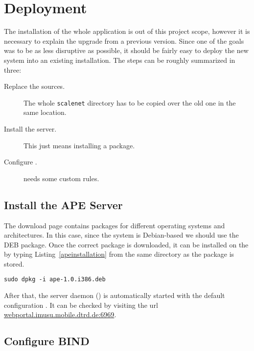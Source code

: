 \section{Deployment} %
\label{sec:deployment}

The installation of the whole  application is out of this project scope, however it is necessary to explain the upgrade from a previous version.
Since one of the goals was to be as less disruptive as possible, it should be fairly easy to deploy the new system into an existing installation.
The steps can be roughly summarized in three:

\begin{description}
  \item[Replace the  sources.] The whole \texttt{scalenet} directory has to be copied over the old one in the same location.
  \item[Install the  server.] This just means installing a package.
  \item[Configure .]  needs some custom rules.
\end{description}

\subsection{Install the APE Server} %
\label{sub:apeinstall}

The  download page \cite{ApeDownload} contains packages for different operating systems and architectures.
In this case, since the system is Debian-based we should use the DEB package.
Once the correct package is downloaded, it can be installed on the  by typing Listing~\vref{apeinstallation} from the same directory as the package is stored.

\begin{lstlisting}[label=apeinstallation,caption=APE installation command]
  sudo dpkg -i ape-1.0.i386.deb
\end{lstlisting}

After that, the  server daemon () is automatically started with the default configuration \cite{ApeSetup}.
It can be checked by visiting the url \url{webportal.imusu.mobile.dtrd.de:6969}.


\subsection{Configure BIND} %
\label{sub:bind}

